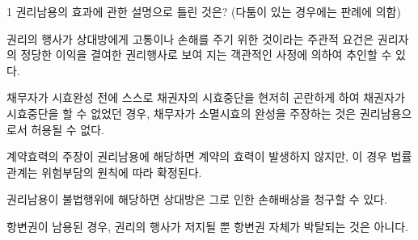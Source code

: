 \begin{question}{1}
권리남용의 효과에 관한 설명으로 틀린 것은? (다툼이 있는 경우에는 판례에 의함)
\begin{choices}
  \item 권리의 행사가 상대방에게 고통이나 손해를 주기 위한 것이라는 주관적 요건은 권리자의 정당한 이익을 결여한 권리행사로 보여 지는 객관적인 사정에 의하여 추인할 수 있다.
  \item 채무자가 시효완성 전에 스스로 채권자의 시효중단을 현저히 곤란하게 하여 채권자가 시효중단을 할 수 없었던 경우, 채무자가 소멸시효의 완성을 주장하는 것은 권리남용으로서 허용될 수 없다.
  \item 계약효력의 주장이 권리남용에 해당하면 계약의 효력이 발생하지 않지만, 이 경우 법률관계는 위험부담의 원칙에 따라 확정된다.
  \item 권리남용이 불법행위에 해당하면 상대방은 그로 인한 손해배상을 청구할 수 있다.
  \item 항변권이 남용된 경우, 권리의 행사가 저지될 뿐 항변권 자체가 박탈되는 것은 아니다.
\end{choices}
\end{question}
